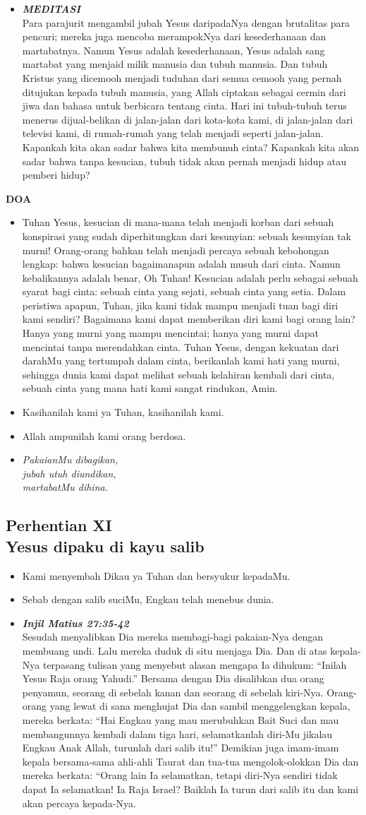 \documentclass[a5paper,titlepage,11pt,openany]{scrbook}
\newcommand{\BU}[1]{\begin{itemize} \item[U:] #1 \end{itemize}}
\newcommand{\BP}[1]{\begin{itemize} \item[P:] #1 \end{itemize}}
\newcommand{\kamiMenyembah}{\BP{ Kami menyembah Dikau ya Tuhan dan bersyukur kepadaMu.}
\BU{Sebab dengan salib suciMu, Engkau telah menebus dunia.}
}
\newcommand{\kasihanilahKami}{\BP{Kasihanilah kami ya Tuhan, kasihanilah kami.}
\BU{Allah ampunilah kami orang berdosa.}}
\newcommand{\BPi}[2]
{\begin{itemize} \item[P1:] \textbf{\emph{#1}}\\#2 \end{itemize}}
\newcommand{\BPii}[1]
{\begin{itemize} \item[P2:] \textbf{\emph{MEDITASI}}\\#1 \end{itemize}}
\newcommand{\lagu}[2]{%
\begin{itemize}
\item[#1.] \it{#2}
\end{itemize}}
\newcommand{\henti}[2]{%
\subsection*{Perhentian #1\\#2 } 
\kamiMenyembah
}
\begin{document}
\BPii{
	Para parajurit mengambil jubah Yesus daripadaNya dengan brutalitas para pencuri; mereka juga mencoba merampokNya dari kesederhanaan dan martabatnya. Namun Yesus adalah kesederhanaan, Yesus adalah sang martabat yang menjaid milik manusia dan tubuh manusia. Dan tubuh Kristus yang dicemooh menjadi tuduhan dari semua cemooh yang pernah ditujukan kepada tubuh manusia, yang Allah ciptakan sebagai cermin dari jiwa dan bahasa untuk berbicara tentang cinta. Hari ini tubuh-tubuh terus menerus dijual-belikan di jalan-jalan dari kota-kota kami, di jalan-jalan dari televisi kami, di rumah-rumah yang telah menjadi seperti jalan-jalan. Kapankah kita akan sadar bahwa kita membunuh cinta? Kapankah kita akan sadar bahwa tanpa kesucian, tubuh tidak akan pernah menjadi hidup atau pemberi hidup? }

\textbf{DOA}

\BU{Tuhan Yesus, kesucian di mana-mana telah menjadi korban dari sebuah konspirasi yang sudah diperhitungkan dari kesunyian: sebuah kesunyian tak murni! Orang-orang bahkan telah menjadi percaya sebuah kebohongan lengkap: bahwa kesucian bagaimanapun adalah musuh dari cinta. Namun kebalikannya adalah benar, Oh Tuhan! Kesucian adalah perlu sebagai sebuah syarat bagi cinta: sebuah cinta yang sejati, sebuah cinta yang setia. Dalam peristiwa apapun, Tuhan, jika kami tidak mampu menjadi tuan bagi diri kami sendiri? Bagaimana kami dapat memberikan diri kami bagi orang lain? Hanya yang murni yang mampu mencintai; hanya yang murni dapat mencintai tanpa merendahkan cinta. Tuhan Yesus, dengan kekuatan dari darahMu yang tertumpah dalam cinta, berikanlah kami hati yang murni, sehingga dunia kami dapat melihat sebuah kelahiran kembali dari cinta, sebuah cinta yang mana hati kami sangat rindukan, Amin.}



\kasihanilahKami

\lagu{11}{PakaianMu dibagikan,\\
jubah utuh diundikan,\\
martabatMu dihina.}

\henti{XI}{	Yesus dipaku di kayu salib}

\BPi{	Injil Matius 27:35-42 }{
	Sesudah menyalibkan Dia mereka membagi-bagi pakaian-Nya dengan membuang undi. Lalu mereka duduk di situ menjaga Dia. Dan di atas kepala-Nya terpasang tulisan yang menyebut alasan mengapa Ia dihukum: ``Inilah Yesus Raja orang Yahudi.'' Bersama dengan Dia disalibkan dua orang penyamun, seorang di sebelah kanan dan seorang di sebelah kiri-Nya. Orang-orang yang lewat di sana menghujat Dia dan sambil menggelengkan kepala, mereka berkata: ``Hai Engkau yang mau merubuhkan Bait Suci dan mau membangunnya kembali dalam tiga hari, selamatkanlah diri-Mu jikalau Engkau Anak Allah, turunlah dari salib itu!'' Demikian juga imam-imam kepala bersama-sama ahli-ahli Taurat dan tua-tua mengolok-olokkan Dia dan mereka berkata: ``Orang lain Ia selamatkan, tetapi diri-Nya sendiri tidak dapat Ia selamatkan! Ia Raja Israel? Baiklah Ia turun dari salib itu dan kami akan percaya kepada-Nya. }
\end{document}
